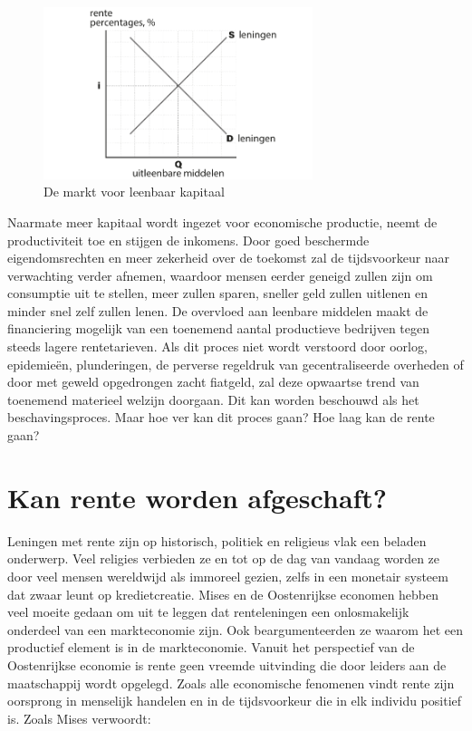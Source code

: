 \begin{figure}
\centering
    \includegraphics[width=0.7\textwidth]{figures/fig30.pdf}
    \caption[De markt voor leenbaar kapitaal]{De markt voor leenbaar kapitaal}
    \label{fig30}
\end{figure}

Naarmate meer kapitaal wordt ingezet voor economische productie, neemt de productiviteit toe en stijgen de inkomens. Door goed beschermde eigendomsrechten en meer zekerheid over de toekomst zal de tijdsvoorkeur naar verwachting verder afnemen, waardoor mensen eerder geneigd zullen zijn om consumptie uit te stellen, meer zullen sparen, sneller geld zullen uitlenen en minder snel zelf zullen lenen. De overvloed aan leenbare middelen maakt de financiering mogelijk van een toenemend aantal productieve bedrijven tegen steeds lagere rentetarieven. Als dit proces niet wordt verstoord door oorlog, epidemieën, plunderingen, de perverse regeldruk van gecentraliseerde overheden of door met geweld opgedrongen zacht fiatgeld, zal deze opwaartse trend van toenemend materieel welzijn doorgaan. Dit kan worden beschouwd als het beschavingsproces. Maar hoe ver kan dit proces gaan? Hoe laag kan de rente gaan?

\hypertarget{kan-rente-worden-afgeschaft}{%
\section{Kan rente worden afgeschaft?}\label{kan-rente-worden-afgeschaft}}

Leningen met rente zijn op historisch, politiek en religieus vlak een beladen onderwerp. Veel religies verbieden ze en tot op de dag van vandaag worden ze door veel mensen wereldwijd als immoreel gezien, zelfs in een monetair systeem dat zwaar leunt op kredietcreatie. Mises en de Oostenrijkse economen hebben veel moeite gedaan om uit te leggen dat renteleningen een onlosmakelijk onderdeel van een markteconomie zijn. Ook beargumenteerden ze waarom het een productief element is in de markteconomie. Vanuit het perspectief van de Oostenrijkse economie is rente geen vreemde uitvinding die door leiders aan de maatschappij wordt opgelegd. Zoals alle economische fenomenen vindt rente zijn oorsprong in menselijk handelen en in de tijdsvoorkeur die in elk individu positief is. Zoals Mises verwoordt:

